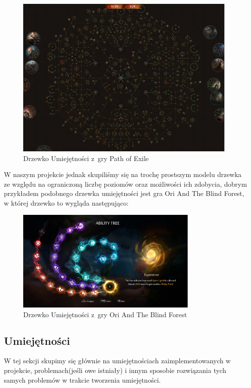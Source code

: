 \documentclass[oneside,polski,logo]{amuthesis}
\begin{document}
\begin{figure}[h]
	\centering
	\includegraphics[width=11cm]{images/kozubal/poe.png}
	\caption{Drzewko Umiejętności z~gry Path of Exile }
\end{figure}
\newpage
W naszym projekcie jednak skupiliśmy się na trochę prostszym modelu drzewka ze względu na ograniczoną liczbę poziomów oraz możliwości ich zdobycia, dobrym przykładem podobnego drzewka umiejętności jest gra Ori And The Blind Forest, w której drzewko to wygląda następująco:

\begin{figure}[h]
	\centering
	\includegraphics[width=9cm]{images/kozubal/ori.jpg}
	\caption{Drzewko Umiejętności z~gry Ori And The Blind Forest}
\end{figure}
\subsection{Umiejętności}
W tej sekcji skupimy się głównie na umiejętnościach zaimplementowanych w projekcie, problemach(jeśli owe istniały) i innym sposobie rozwiązania tych samych problemów w trakcie tworzenia umiejętności.
\end{document}
